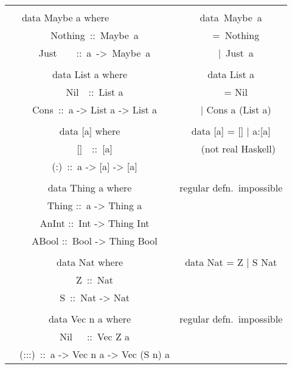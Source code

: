 \documentclass{refcard}
\begin{document}
\begin{ldesc}
	\li[enabling] 
\end{ldesc}\\[1ex]
\begin{tabular}{CC}
\\
data Maybe a where~~~~~~~~~~ & data~Maybe~a \\
~~Nothing~::~Maybe~a         & ~~=~Nothing  \\
~~Just~~~~::~a~->~Maybe~a    & ~~|~Just~a   \\
\\
data List a where                & data List a         \\
~~Nil~~::~List a                 & ~~= Nil             \\
~~Cons~::~a -> List a -> List a  & ~~| Cons a (List a) \\
\\
data [a] where                   & data [a] = [] | a:[a] \\
~~[]~~::~[a]                     & ~~\textnormal{\footnotesize ~(not real Haskell)} \\
~~(:)~::~a -> [a] -> [a]         & \\
\\
data Thing a where            & \textnormal{regular defn.~impossible} \\
~~Thing ::~a -> Thing a       & \\
~~AnInt ::~Int -> Thing Int   & \\
~~ABool ::~Bool -> Thing Bool & \\
\\
data Nat where      & data Nat = Z | S Nat \\
~~Z~::~Nat & \\
~~S~::~Nat -> Nat & \\
\\
data Vec n a where & \textnormal{regular defn.~impossible} \\
~~Nil~~~::~Vec Z a & \\
~~(:::)~::~a -> Vec n a -> Vec (S n) a \hspace{-8ex} & \\
\end{tabular}
\end{document}
